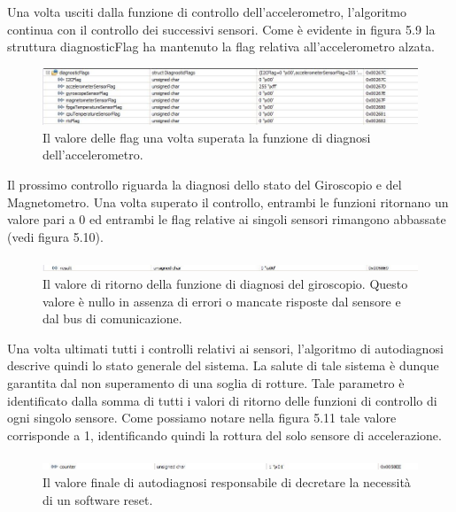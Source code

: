 \documentclass[LaM,binding=0.6cm]{../sapthesis}
\begin{document}
Una volta usciti dalla funzione di controllo dell'accelerometro, l'algoritmo continua con il controllo dei successivi sensori. Come è evidente in figura 5.9 la struttura diagnosticFlag ha mantenuto la flag relativa all'accelerometro alzata.
\newline
\begin{figure}[htbp]
\centerline{\includegraphics[scale=0.6]{examples/6_accelerometerIdBad.JPG}}
\caption{Il valore delle flag una volta superata la funzione di diagnosi dell'accelerometro.}
\label{fig}
\end{figure}

Il prossimo controllo riguarda la diagnosi dello stato del Giroscopio e del Magnetometro. Una volta superato il controllo, entrambi le funzioni ritornano un valore pari a 0 ed entrambi le flag relative ai singoli sensori rimangono abbassate (vedi figura 5.10).\newpage
\begin{figure}[htbp]
\centerline{\includegraphics[scale=0.6]{examples/7_GiroscopioResultGoodI2CAndGoodMagnetometerId.JPG}}
\caption{Il valore di ritorno della funzione di diagnosi del giroscopio. Questo valore è nullo in assenza di errori o mancate risposte dal sensore e dal bus di comunicazione.}
\label{fig}
\end{figure}

Una volta ultimati tutti i controlli relativi ai sensori, l'algoritmo di autodiagnosi descrive quindi lo stato generale del sistema. La salute di tale sistema è dunque garantita dal non superamento di una soglia di rotture. Tale parametro è identificato dalla somma di tutti i valori di ritorno delle funzioni di controllo di ogni singolo sensore. Come possiamo notare nella figura 5.11 tale valore corrisponde a 1, identificando quindi la rottura del solo sensore di accelerazione.\newline
\begin{figure}[htbp]
\centerline{\includegraphics[scale=0.6]{examples/8_giroscopioCounterRimaneAUno.JPG}}
\caption{Il valore finale di autodiagnosi responsabile di decretare la necessità di un software reset. }
\label{fig}
\end{figure}
\end{document}
